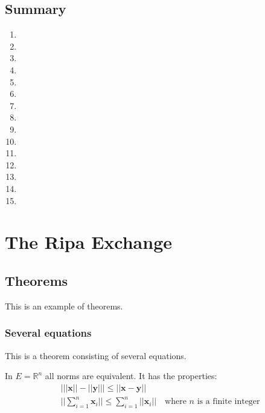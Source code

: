 \documentclass[11pt,fleqn]{book} %
\begin{document}
\section{Summary}
\begin{enumerate}
	\item \lipsum[1]
	\item \lipsum[2]
	\item \lipsum[3]
	\item \lipsum[4]
	\item \lipsum[5]
	\item \lipsum[6]
	\item \lipsum[7]
	\item \lipsum[8]
	\item \lipsum[9]
	\item \lipsum[10]
	\item \lipsum[11]
	\item \lipsum[12]
	\item \lipsum[13]
	\item \lipsum[14]
	\item \lipsum[15]
\end{enumerate}




\chapter{The Ripa Exchange}

\section{Theorems}

This is an example of theorems.

\subsection{Several equations}
This is a theorem consisting of several equations.

\begin{theorem}
	In $E=\mathbb{R}^n$ all norms are equivalent. It has the properties:
	\begin{align}
		 & \big| ||\mathbf{x}|| - ||\mathbf{y}|| \big|\leq || \mathbf{x}- \mathbf{y}||                            \\
		 & ||\sum_{i=1}^n\mathbf{x}_i||\leq \sum_{i=1}^n||\mathbf{x}_i||\quad\text{where $n$ is a finite integer}
	\end{align}
\end{theorem}
\end{document}
